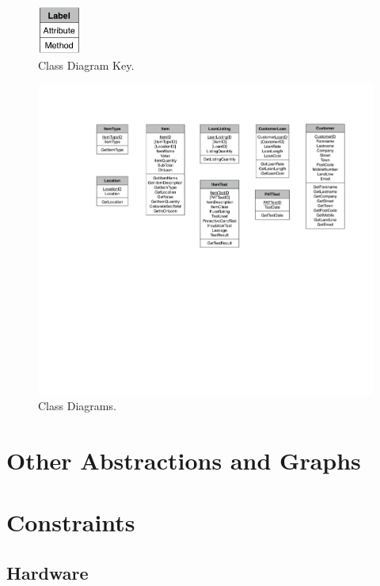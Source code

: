 \begin{landscape}
    \begin{figure}[H]
        \centerline{\includegraphics[width=54px]{./Analysis/Class_Definitions/Class_definition_key.pdf}}
        \caption{Class Diagram Key.} \label{fig:relationship_diagram}
    \end{figure}

    \begin{figure}[H]
        \centerline{\includegraphics[width=500px]{./Analysis/Class_Definitions/Class_diagrams.pdf}}
        \caption{Class Diagrams.} \label{fig:relationship_diagram}
    \end{figure}
\end{landscape}


\section{Other Abstractions and Graphs}

\section{Constraints}

\subsection{Hardware}

